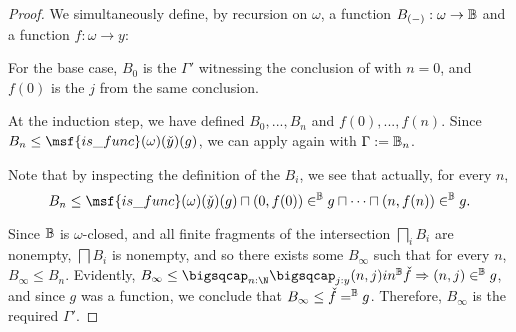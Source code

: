 \documentclass[11pt]{article}
\newcommand{\func}{\msf{.func}}
\newcommand{\type}{\msf{.type}}
\begin{document}
\begin{proof}
  We simultaneously define, by recursion on $\omega$, a function $B_{(-)} : \omega \to \mathbb{B}$ and a function $f : \omega \to y$:

  For the base case, $B_0$ is the $\Gamma'$ witnessing the conclusion of  with $n = 0$, and $f(0)$ is the $j$ from the same conclusion.

  At the induction step, we have defined $B_0,...,B_n$ and $f(0),...,f(n)$.
  Since $B_n \leq \msf{is\_func}(\omega) (\check{y}) (g)$, we can apply  again with $\Gamma := \mathbb{B}_n$.

  Note that by inspecting the definition of the $B_i$, we see that actually, for every $n$,
  $$
B_n \leq \msf{is\_func}(\omega) (\check{y}) (g) \sqcap (0, f(0)) \in^\B g \sqcap \cdots \sqcap (n, f(n)) \in^\B g.
$$

Since $\mathbb{B}$ is $\omega$-closed, and all finite fragments of the intersection $\bigsqcap_i B_i$ are nonempty, $\bigsqcap B_i$ is nonempty, and so there exists some $B_{\infty}$ such that for every $n$, $B_{\infty} \leq B_n$. Evidently, $B_\infty \leq \bigsqcap_{n : \N} \bigsqcap_{j : y} (n,j) in^\B \check{f} \Rightarrow (n,j) \in^\B g$, and since $g$ was a function, we conclude that $B_{\infty} \leq \check{f} =^{\mathbb{B}} g$. Therefore, $B_\infty$ is the required $\Gamma'$.
\end{proof}



\end{document}
